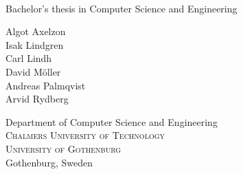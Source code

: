 
\begin{titlepage}
			
\addtolength{\voffset}{2cm}

\begin{figure}[H]
\centering
\vspace{1cm}	%
\end{figure}

\mbox{}
\vfill
\renewcommand{\familydefault}{\sfdefault} \normalfont %

\textbf{\Huge \multiLineTitle{0.2cm}} 
\\[0.5cm]

Bachelor's thesis in Computer Science and Engineering
\\
\setlength{\parskip}{1cm}

{\Large Algot Axelzon} \setlength{\parskip}{2.9cm}\\[1ex]
{\Large Isak Lindgren} \setlength{\parskip}{2.9cm}\\[1ex]
{\Large Carl Lindh} \setlength{\parskip}{2.9cm}\\[1ex]
{\Large David Möller} \setlength{\parskip}{2.9cm}\\[1ex]
{\Large Andreas Palmqvist} \setlength{\parskip}{2.9cm}\\[1ex]
{\Large Arvid Rydberg} \setlength{\parskip}{2.9cm}

Department of Computer Science and Engineering \\
\textsc{Chalmers University of Technology} \\
\textsc{University of Gothenburg} \\
Gothenburg, Sweden \the\year

\renewcommand{\familydefault}{\rmdefault} \normalfont %
\end{titlepage}


